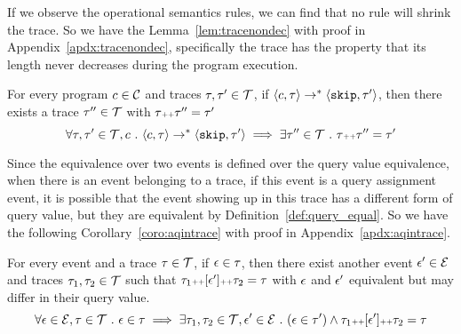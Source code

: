   
  If we observe the operational semantics rules, we can find that no rule will shrink the trace. 
So we have the Lemma~\ref{lem:tracenondec} with proof in Appendix~\ref{apdx:tracenondec}, 
specifically the trace has the property that its length never decreases during the program execution.
\begin{lem}
\label{lem:tracenondec}
For every program $c \in \mathcal{C}$ and traces $\mathtt{\tau}, \mathtt{\tau}' \in \mathcal{T}$, if 
$\langle c, \mathtt{\tau} \rangle \rightarrow^{*} \langle \mathtt{skip}, \mathtt{\tau}' \rangle$,
then there exists a trace $\mathtt{\tau}'' \in \mathcal{T}$ with $\mathtt{\tau} {\scriptscriptstyle ++} \mathtt{\tau}'' = \mathtt{\tau}'$
%
$$
\forall \mathtt{\tau}, \mathtt{\tau}' \in \mathcal{T}, c ~.~ 
\langle c, \mathtt{\tau} \rangle \rightarrow^{*} \langle \mathtt{skip}, \mathtt{\tau}' \rangle 
\implies \exists \mathtt{\tau}'' \in \mathcal{T} ~.~ \mathtt{\tau} {\scriptscriptstyle ++} \mathtt{\tau}'' = \mathtt{\tau}'
$$
\end{lem}
Since the equivalence over two events is defined over the query value equivalence, 
when there is an event belonging to a trace, 
if this event is a query assignment event, 
it is possible that 
the event showing up in this trace has a different form of query value, 
but they are equivalent by Definition~\ref{def:query_equal}.
So we have the following Corollary~\ref{coro:aqintrace} with proof in Appendix~\ref{apdx:aqintrace}.
\begin{coro}
\label{coro:aqintrace}
For every event and a trace $\mathtt{\tau} \in \mathcal{T}$,
if $\mathtt{\epsilon} \in \mathtt{\tau}$, 
then there exist another event $\mathtt{\epsilon}' \in \mathcal{E}$ and traces $\mathtt{\tau}_1, \mathtt{\tau}_2 \in \mathcal{T}$
such that $\mathtt{\tau}_1 {\scriptscriptstyle ++} [\mathtt{\epsilon}'] {\scriptscriptstyle ++} \mathtt{\tau}_2 = \mathtt{\tau} $
with 
$\mathtt{\epsilon}$ and $\mathtt{\epsilon}'$ equivalent but may differ in their query value.
\[
  \forall \mathtt{\epsilon} \in \mathcal{E}, \mathtt{\tau} \in \mathcal{T} ~.~ 
\mathtt{\epsilon} \in \mathtt{\tau} \implies \exists \mathtt{\tau}_1, \mathtt{\tau}_2 \in \mathcal{T}, 
\mathtt{\epsilon}' \in \mathcal{E} ~.~ (\mathtt{\epsilon} \in \mathtt{\tau}') \land \mathtt{\tau}_1 {\scriptscriptstyle ++} [\mathtt{\epsilon}'] {\scriptscriptstyle ++} \mathtt{\tau}_2 = \mathtt{\tau}  
\]
\end{coro}